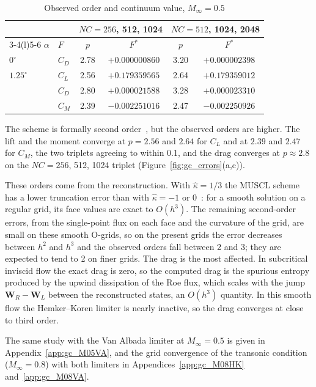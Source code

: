 \documentclass[12pt,a4paper]{article}
\begin{document}
\begin{table}[H]
\centering
\caption{Observed order and continuum value, $M_\infty=0.5$}
\label{tab:gc_orders}
\footnotesize
\setlength{\tabcolsep}{4pt}
\renewcommand{\arraystretch}{1.0}
\begin{tabular}{@{}llcccc@{}}
\toprule
 & & \multicolumn{2}{c}{$NC=256$, 512, 1024} & \multicolumn{2}{c}{$NC=512$, 1024, 2048} \\
\cmidrule(lr){3-4}\cmidrule(l){5-6}
$\alpha$ & $F$ & $p$ & $F^*$ & $p$ & $F^*$ \\
\midrule
$0^\circ$    & $C_D$ & 2.78 & $+0.000000860$ & 3.20 & $+0.000002398$ \\
$1.25^\circ$ & $C_L$ & 2.56 & $+0.179359565$ & 2.64 & $+0.179359012$ \\
             & $C_D$ & 2.80 & $+0.000021588$ & 3.28 & $+0.000023310$ \\
             & $C_M$ & 2.39 & $-0.002251016$ & 2.47 & $-0.002250926$ \\
\bottomrule
\end{tabular}
\end{table}

The scheme is formally second order~\cite{blazek}, but the observed orders are higher. The lift
and the moment converge at $p=2.56$ and $2.64$ for $C_L$ and at $2.39$ and $2.47$ for $C_M$, the two
triplets agreeing to within 0.1, and the drag converges at $p\approx2.8$ on the $NC=256$, 512, 1024
triplet (Figure~\ref{fig:gc_errors}(a,c)).

These orders come from the reconstruction. With $\hat\kappa=1/3$ the MUSCL scheme has a lower
truncation error than with $\hat\kappa=-1$ or 0~\cite{blazek}: for a smooth solution on a regular
grid, its face values are exact to $O(h^3)$. The remaining second-order errors, from the
single-point flux on each face and the curvature of the grid, are small on these smooth O-grids,
so on the present grids the error decreases between $h^2$ and $h^3$ and the observed orders fall
between 2 and 3; they are expected to tend to 2 on finer grids. The drag is the most affected. In
subcritical inviscid flow the exact drag is zero, so the computed drag is the spurious entropy
produced by the upwind dissipation of the Roe flux, which scales with the jump
$\mathbf{W}_R-\mathbf{W}_L$ between the reconstructed states, an $O(h^3)$ quantity. In this smooth
flow the Hemker--Koren limiter is nearly inactive, so the drag converges at close to third order.

The same study with the Van Albada limiter at $M_\infty=0.5$ is given in Appendix~\ref{app:gc_M05VA},
and the grid convergence of the transonic condition ($M_\infty=0.8$) with both limiters in
Appendices~\ref{app:gc_M08HK} and~\ref{app:gc_M08VA}.
\end{document}

